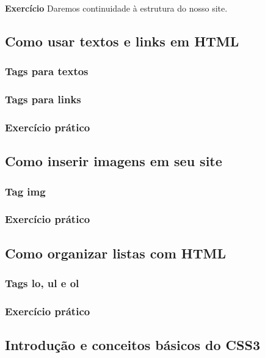 \documentclass[12pt,a4paper]{article}
\begin{document}
	\textbf{Exercício} Daremos continuidade à estrutura do nosso site.
	
	\subsection{Como usar textos e links em HTML}
	\subsubsection{Tags para textos}
	
	\subsubsection{Tags para links}
	
	\subsubsection{Exercício prático}
	
	
	
	\subsection{Como inserir imagens em seu site}
	\subsubsection{Tag img}
	
	\subsubsection{Exercício prático}
	
	
	
	\subsection{Como organizar listas com HTML}
	\subsubsection{Tags lo, ul e ol}
	
	\subsubsection{Exercício prático}
	
	
	
	\subsection{Introdução e conceitos básicos do CSS3}
\end{document}
